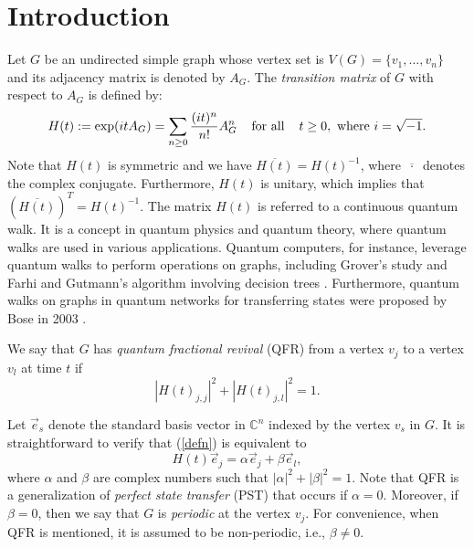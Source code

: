 \documentclass[12pt]{amsart}
\numberwithin{equation}{section}
\theoremstyle{definition}
\theoremstyle{definition} \numberwithin{equation}{section}
\begin{document}
\maketitle

\section{Introduction}
Let $G$ be an undirected simple graph whose vertex set is $V(G) = \{v_1, \ldots, v_n \}$ and its adjacency matrix is denoted by $A_G$. The {\it transition matrix} of $G$ with respect to $A_G$ is defined by:
\begin{equation*}
    H(t) := \exp(itA_G)= \sum_{n\ge 0} \frac{(it)^n}{n!}A_G^n \hspace{4mm} \text{for all} \hspace{4mm} t \ge 0, \text{ where } i = \sqrt{-1}.
\end{equation*} 
Note that $H(t)$ is symmetric and we have $ \overline{H(t)} = H(t)^{-1} $, where $\overline{ \  \cdot  \ }$ denotes the complex conjugate. Furthermore, $H(t)$ is unitary, which implies that $(\overline{H(t)})^T = H(t)^{-1}$. The matrix $H(t)$ is referred to a continuous quantum walk. It is a concept in
quantum physics and quantum theory, where quantum walks are used in various applications. Quantum computers, for instance, leverage quantum walks to perform operations on graphs, including Grover's study \cite{GL} and Farhi and Gutmann's algorithm involving decision trees \cite{FE}. Furthermore, quantum walks on graphs in quantum networks for transferring states were proposed by Bose in 2003 \cite{BS}.


We say that $G$ has \textit{quantum fractional revival} (QFR) from a vertex $v_j$ to a vertex $v_l$ at time $t$ if 
\begin{equation} \label{defn}
    |H(t)_{j, j}|^2 + |H(t)_{j, l}|^2 = 1.
\end{equation}

Let $\vec{e}_s$ denote the standard basis vector in $\mathbb{C}^n$ indexed by the vertex $v_s$ in $G$. It is straightforward to verify that (\ref{defn}) is equivalent to
\[
H(t)\vec{e}_j = \alpha \vec{e}_j + \beta \vec{e}_l,
\]
where $\alpha$ and $\beta$ are complex numbers such that $|\alpha|^2 + |\beta|^2 = 1$. Note that QFR is a generalization of {\it perfect state transfer} (PST) that occurs if $\alpha = 0$. Moreover, if $\beta = 0$, then we say that $G$ is {\it periodic} at the vertex $v_j$. For convenience, when QFR is mentioned, it is assumed to be non-periodic, i.e., $\beta \neq 0$.
\end{document}
